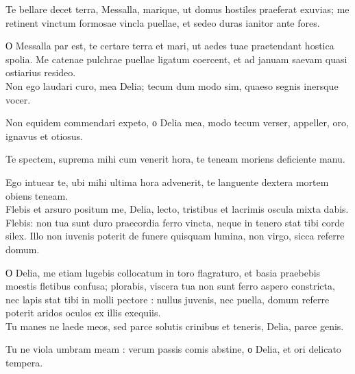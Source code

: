 {\large
\noindent Te bellare decet terra, Messalla, marique, ut domus hostiles praeferat exuvias; me retinent vinctum formosae vincla puellae, et sedeo duras ianitor ante fores.\\

}

\noindent О Messalla par est, te certare terra et mari, ut aedes tuae praetendant hostica spolia. Me catenae pulchrae puellae ligatum coercent, et ad januam saevam quasi ostiarius resideo. \\

{\large
\noindent Non ego laudari curo, mea Delia; tecum dum modo sim, quaeso segnis inersque vocer.\\

}

\noindent Non equidem commendari expeto, о Delia mea, modo tecum verser, appeller, oro, ignavus et otiosus. \\

\newpage

{\large
\noindent Te spectem, suprema mihi cum venerit hora, te teneam moriens deficiente manu.\\

}

\noindent Ego intuear te, ubi mihi ultima hora advenerit, te languente dextera mortem obiens teneam. \\

{\large
\noindent Flebis et arsuro positum me, Delia, lecto, tristibus et lacrimis oscula mixta dabis. Flebis: non tua sunt duro praecordia ferro vincta, neque in tenero stat tibi corde silex. Illo non iuvenis poterit de funere quisquam lumina, non virgo, sicca referre domum.\\

}

\noindent О Delia, me etiam lugebis collocatum in toro flagraturo, et basia praebebis moestis fletibus confusa; plorabis, viscera tua non sunt ferro aspero constricta, nec lapis stat tibi in molli pectore : nullus juvenis, nec puella, domum referre poterit aridos oculos ex illis exequiis. \\

{\large
\noindent Tu manes ne laede meos, sed parce solutis crinibus et teneris, Delia, parce genis.\\

}


\noindent Tu ne viola umbram meam : verum passis comis abstine, о Delia, et ori delicato tempera. \\

